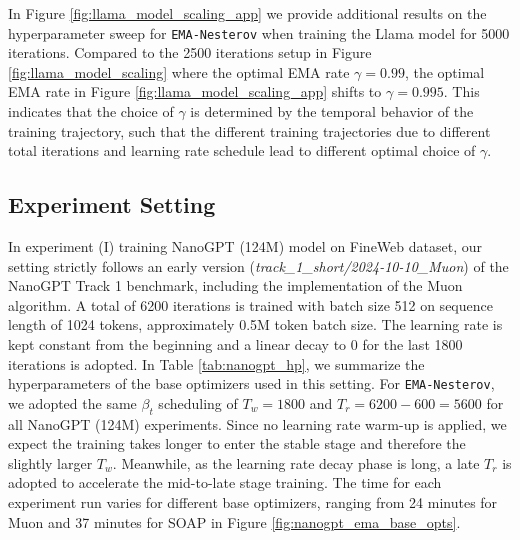 \documentclass{article}
\theoremstyle{plain}
\theoremstyle{definition}
\theoremstyle{remark}
\def\algname{{\tt EMA-Nesterov}}
\begin{document}
In Figure \ref{fig:llama_model_scaling_app} we provide additional results on the hyperparameter sweep for {\algname} when training the Llama model for 5000 iterations. Compared to the 2500 iterations setup in Figure \ref{fig:llama_model_scaling} where the optimal EMA rate $\gamma = 0.99$, the optimal EMA rate in Figure \ref{fig:llama_model_scaling_app} shifts to $\gamma = 0.995$. This indicates that the choice of $\gamma$ is determined by the temporal behavior of the training trajectory, such that the different training trajectories due to different total iterations and learning rate schedule lead to different optimal choice of $\gamma$.
\newpage
\subsection{Experiment Setting} \label{app:exp}
In experiment (I) training NanoGPT (124M) model on FineWeb dataset, our setting strictly follows an early version (\emph{track\_1\_short/2024-10-10\_Muon}) of the NanoGPT Track 1 benchmark, including the implementation of the Muon algorithm. A total of 6200 iterations is trained with batch size 512 on sequence length of 1024 tokens, approximately 0.5M token batch size. The learning rate is kept constant from the beginning and a linear decay to 0 for the last 1800 iterations is adopted. In Table \ref{tab:nanogpt_hp}, we summarize the hyperparameters of the base optimizers used in this setting. For {\algname}, we adopted the same $\beta_t$ scheduling of $T_w = 1800$ and $T_r = 6200 - 600 = 5600$ for all NanoGPT (124M) experiments. Since no learning rate warm-up is applied, we expect the training takes longer to enter the stable stage and therefore the slightly larger $T_w$. Meanwhile, as the learning rate decay phase is long, a late $T_r$ is adopted to accelerate the mid-to-late stage training. 
The time for each experiment run varies for different base optimizers, ranging from 24 minutes for Muon and 37 minutes for SOAP in Figure \ref{fig:nanogpt_ema_base_opts}.
\end{document}
